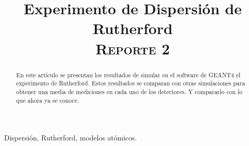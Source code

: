 \documentclass[conference]{IEEEtran}
\begin{document}
\title{Experimento de Dispersión de Rutherford \\
{\footnotesize \scshape{Reporte 2}}
}

\author{
}



\maketitle

\begin{abstract}
    En este artículo se presentan los resultados de simular en el software de GEANT4 el experimento de Rutherford. Estos resultados se comparan con otras simulaciones para obtener una media de mediciones en cada uno de los detectores. Y compararlo con lo que ahora ya se conoce.
\end{abstract}

\begin{IEEEkeywords}
	Dispersión, Rutherford, modelos atómicos.
\end{IEEEkeywords}

%
    
\end{document}
